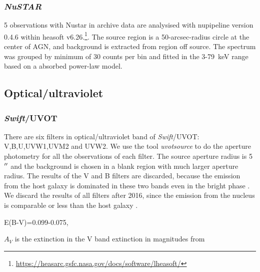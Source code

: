 \documentclass{aastex63}
\newcommand{\nustar}{{\em NuSTAR}}
\newcommand{\swift}{{\em Swift}}
\begin{document}
\subsubsection{\nustar}
5 observations with Nustar in archive data are analysised with nupipeline version 0.4.6 within heasoft v6.26.\footnote{\url{https://heasarc.gsfc.nasa.gov/docs/software/lheasoft/}}. The source region is a 50-arcsec-radius circle at the center of AGN, and background is extracted from region off source. The spectrum was grouped by minimum of 30 counts per bin and fitted in the 3-79~keV range based on a absorbed power-law model.


\subsection{Optical/ultraviolet}
\subsubsection{\swift/UVOT}
There are six filters in optical/ultraviolet band of \swift/UVOT: V,B,U,UVW1,UVM2 and UVW2. We use the tool \textit{uvotsource} to do the aperture photometry for all the observations of each filter. The source aperture radius is 5$\mbox{$^{\prime\prime}$}$ and the background is chosen in a blank region with much larger aperture radius. The results of the V and B filters are discarded, because the emission from the host galaxy is dominated in these two bands even in the bright phase \citep{2018MNRAS.480.3898N}. We discard the results of all filters after 2016, since the emission from the nucleus is comparable or less than the host galaxy \citep{2018MNRAS.480.3898N}. 

E(B-V)=0.099-0.075,

$A_V$  is the extinction in the V band
extinction in magnitudes from \citet{2007ApJ...663..320F}
\end{document}
